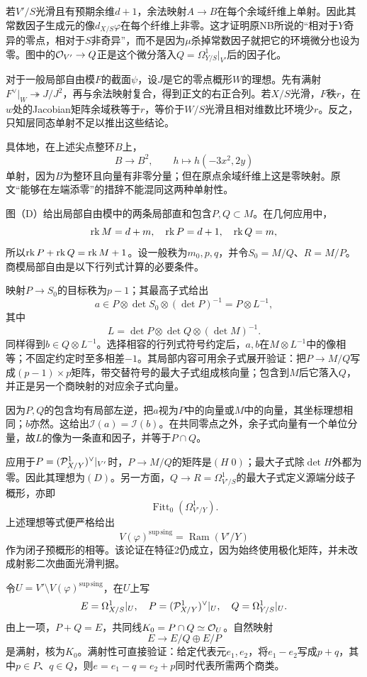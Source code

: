 若$V'/S$光滑且有预期余维$d+1$，余法映射$A\to B$在每个余域纤维上单射。因此其常数因子生成元的像$d_{X/S}\varphi$在每个纤维上非零。这才证明原NB所说的“相对于$Y$奇异的零点，相对于$S$非奇异”，而不是因为$\mu$杀掉常数因子就把它的环境微分也设为零。图中的$\mathcal O_{V'}\to Q$正是这个微分落入$Q=\Omega^1_{Y/S}|_{V'}$后的因子化。

对于一般局部自由模$F$的截面$\psi$，设$J$是它的零点概形$W$的理想。先有满射
$F^\vee|_W\twoheadrightarrow J/J^2$，再与余法映射复合，得到正文的右正合列。若$X/S$光滑，$F$秩$r$，在$w$处的Jacobian矩阵余域秩等于$r$，等价于$W/S$光滑且相对维数比环境少$r$。反之，只知层同态单射不足以推出这些结论。

具体地，在上述尖点整环$B$上，
\[
 B\longrightarrow B^2,\qquad h\longmapsto h(-3x^2,2y)
\]
单射，因为$B$为整环且向量有非零分量；但在原点余域纤维上这是零映射。原文“能够在左端添零”的措辞不能混同这两种单射性。

图（D）给出局部自由模中的两条局部直和包含$P,Q\subset M$。在几何应用中，
\[
 \operatorname{rk} M=d+m,\quad\operatorname{rk} P=d+1,\quad\operatorname{rk} Q=m,
\]
所以$\operatorname{rk} P+\operatorname{rk} Q=\operatorname{rk} M+1$。设一般秩为$m_0,p,q$，并令$S_0=M/Q$、$R=M/P$。商模局部自由是以下行列式计算的必要条件。

映射$P\to S_0$的目标秩为$p-1$；其最高子式给出
\[
 a\in P\otimes\det S_0\otimes(\det P)^{-1}
    =P\otimes L^{-1},
\]
其中
\[
 L=\det P\otimes\det Q\otimes(\det M)^{-1}.
\]
同样得到$b\in Q\otimes L^{-1}$。选择相容的行列式符号约定后，$a,b$在$M\otimes L^{-1}$中的像相等；不固定约定时至多相差$-1$。其局部内容可用余子式展开验证：把$P\to M/Q$写成$(p-1)\times p$矩阵，带交替符号的最大子式组成核向量；包含到$M$后它落入$Q$，并正是另一个商映射的对应余子式向量。

因为$P,Q$的包含均有局部左逆，把$a$视为$P$中的向量或$M$中的向量，其坐标理想相同；$b$亦然。这给出$\mathscr I(a)=\mathscr I(b)$。在共同零点之外，余子式向量有一个单位分量，故$L$的像为一条直和因子，并等于$P\cap Q$。

应用于$P=(\mathcal P^1_{X/Y})^\vee|_{V'}$时，$P\to M/Q$的矩阵是$(H\;0)$；最大子式除$\det H$外都为零。因此其理想为$(D)$。另一方面，$Q\to R=\Omega^1_{V'/S}$的最大子式定义源端分歧子概形，亦即
\[
 \operatorname{Fitt}_0(\Omega^1_{V'/Y}).
\]
上述理想等式便严格给出
\[
 V(\varphi)^{\mathrm{sup\,sing}}
   =\operatorname{Ram}(V'/Y)
\]
作为闭子预概形的相等。该论证在特征2仍成立，因为始终使用极化矩阵，并未改成射影二次曲面光滑判据。

令$U=V'\setminus V(\varphi)^{\mathrm{sup\,sing}}$，在$U$上写
\[
 E=\Omega^1_{X/S}|_U,\quad
 P=(\mathcal P^1_{X/Y})^\vee|_U,\quad
 Q=\Omega^1_{Y/S}|_U.
\]
由上一项，$P+Q=E$，共同线$K_0=P\cap Q\simeq\mathcal O_U$。自然映射
\[
 E\longrightarrow E/Q\oplus E/P
\]
是满射，核为$K_0$。满射性可直接验证：给定代表元$e_1,e_2$，将$e_1-e_2$写成$p+q$，其中$p\in P$、$q\in Q$，则$e=e_1-q=e_2+p$同时代表所需两个商类。

